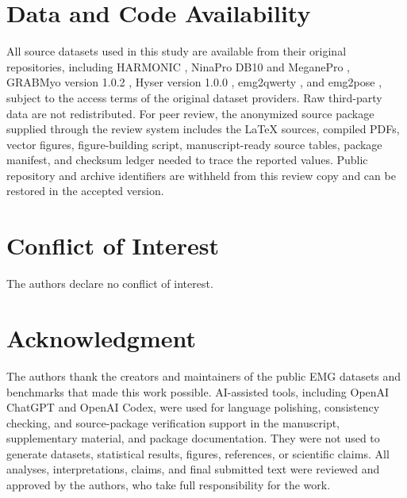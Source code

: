\documentclass[journal]{IEEEtran}
\begin{document}
\section*{Data and Code Availability}
All source datasets used in this study are available from their original repositories, including HARMONIC \cite{newman2022harmonic}, NinaPro DB10 and MeganePro \cite{atzori2014ninapro,giordaniello2017meganepro}, GRABMyo version 1.0.2 \cite{pradhan2022grabmyo}, Hyser version 1.0.0 \cite{jiang2021hyser}, emg2qwerty \cite{sivakumar2024emg2qwerty}, and emg2pose \cite{salter2024emg2pose}, subject to the access terms of the original dataset providers. Raw third-party data are not redistributed. For peer review, the anonymized source package supplied through the review system includes the LaTeX sources, compiled PDFs, vector figures, figure-building script, manuscript-ready source tables, package manifest, and checksum ledger needed to trace the reported values. Public repository and archive identifiers are withheld from this review copy and can be restored in the accepted version.

\section*{Conflict of Interest}
The authors declare no conflict of interest.

\section*{Acknowledgment}
The authors thank the creators and maintainers of the public EMG datasets and benchmarks that made this work possible. AI-assisted tools, including OpenAI ChatGPT and OpenAI Codex, were used for language polishing, consistency checking, and source-package verification support in the manuscript, supplementary material, and package documentation. They were not used to generate datasets, statistical results, figures, references, or scientific claims. All analyses, interpretations, claims, and final submitted text were reviewed and approved by the authors, who take full responsibility for the work.



\end{document}
